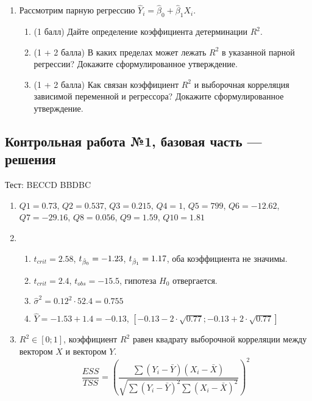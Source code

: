 \begin{enumerate}
\begin{enumerate}
    
\end{enumerate}
    
\item Рассмотрим парную регрессию $\hat Y_i = \hat\beta_0 + \hat\beta_1 X_i$.
    
\begin{enumerate}
\item (1 балл) Дайте определение коэффициента детерминации $R^2$.
\item (1 + 2 балла) В каких пределах может лежать $R^2$ в указанной парной регрессии? Докажите сформулированное утверждение.
\item (1 + 2 балла) Как связан коэффициент $R^2$ и выборочная корреляция зависимой переменной и регрессора? Докажите сформулированное утверждение. 
\end{enumerate}
    
    



\end{enumerate}


\subsection{Контрольная работа №1, базовая часть — решения}

Тест: BECCD BBDBC

\begin{enumerate}
\item $Q1 = 0.73$, $Q2 = 0.537$, $Q3 = 0.215$, $Q4 = 1$, $Q5 = 799$, 
$Q6 = -12.62$, $Q7 = -29.16$, $Q8 = 0.056$, $Q9 = 1.59$, $Q10 = 1.81$


\item 
\begin{enumerate}
\item $t_{crit} = 2.58$, $t_{\hat{\beta}_0} = -1.23$, $t_{\hat{\beta}_1} = 1.17$, оба коэффициента не значимы.
\item $t_{crit} = 2.4$, $t_{obs} = -15.5$, гипотеза $H_0$ отвергается.
\item $\hat \sigma^2 = 0.12^2 \cdot 52.4 = 0.755$
\item $\hat Y = -1.53 + 1.4 = -0.13$, $[-0.13 - 2\cdot \sqrt{0.77}; -0.13 + 2\cdot \sqrt{0.77} ]$
\end{enumerate}

\item $R^2 \in [0;1]$, коэффициент $R^2$ равен квадрату выборочной корреляции между вектором $X$ и вектором $Y$.
\[
\frac{ESS}{TSS} = \left(\frac{\sum (Y_i - \bar Y)(X_i - \bar X)}{\sqrt{\sum (Y_i - \bar Y)^2 \sum (X_i - \bar X)^2}}\right)^2
\]
  
\end{enumerate}


